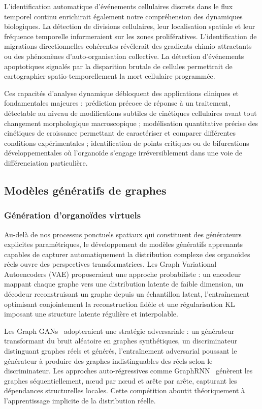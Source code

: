 L'identification automatique d'événements cellulaires discrets dans le flux temporel continu enrichirait également notre compréhension des dynamiques biologiques. La détection de divisions cellulaires, leur localisation spatiale et leur fréquence temporelle informeraient sur les zones prolifératives. L'identification de migrations directionnelles cohérentes révélerait des gradients chimio-attractants ou des phénomènes d'auto-organisation collective. La détection d'événements apoptotiques signalés par la disparition brutale de cellules permettrait de cartographier spatio-temporellement la mort cellulaire programmée.

Ces capacités d'analyse dynamique débloquent des applications cliniques et fondamentales majeures : prédiction précoce de réponse à un traitement, détectable au niveau de modifications subtiles de cinétiques cellulaires avant tout changement morphologique macroscopique ; modélisation quantitative précise des cinétiques de croissance permettant de caractériser et comparer différentes conditions expérimentales ; identification de points critiques ou de bifurcations développementales où l'organoïde s'engage irréversiblement dans une voie de différenciation particulière.

\subsection{Modèles génératifs de graphes}

\subsubsection{Génération d'organoïdes virtuels}

Au-delà de nos processus ponctuels spatiaux qui constituent des générateurs explicites paramétriques, le développement de modèles génératifs apprenants capables de capturer automatiquement la distribution complexe des organoïdes réels ouvre des perspectives transformatrices. Les Graph Variational Autoencoders (VAE) proposeraient une approche probabiliste : un encodeur mappant chaque graphe vers une distribution latente de faible dimension, un décodeur reconstruisant un graphe depuis un échantillon latent, l'entraînement optimisant conjointement la reconstruction fidèle et une régularisation KL imposant une structure latente régulière et interpolable.

Les Graph GANs~\cite{Bojchevski2018,DeKao2018} adopteraient une stratégie adversariale : un générateur transformant du bruit aléatoire en graphes synthétiques, un discriminateur distinguant graphes réels et générés, l'entraînement adversarial poussant le générateur à produire des graphes indistinguables des réels selon le discriminateur. Les approches auto-régressives comme GraphRNN~\cite{You2018GraphRNN} génèrent les graphes séquentiellement, nœud par nœud et arête par arête, capturant les dépendances structurelles locales. Cette compétition aboutit théoriquement à l'apprentissage implicite de la distribution réelle.

